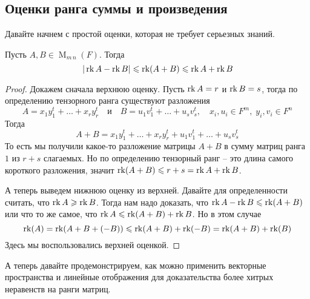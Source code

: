 \subsection{Оценки ранга суммы и произведения}

Давайте начнем с простой оценки, которая не требует серьезных знаний.

\begin{claim}
Пусть $A,B\in \operatorname{M}_{m\, n}(F)$.
Тогда
\[
|\operatorname{rk} A - \operatorname{rk} B| \leqslant \operatorname{rk}(A + B) \leqslant \operatorname{rk} A + \operatorname{rk} B
\]
\end{claim}
\begin{proof}
Докажем сначала верхнюю оценку.
Пусть $\operatorname{rk} A = r$ и $\operatorname{rk} B = s$, тогда по определению тензорного ранга существуют разложения
\[
A = x_1 y_1^t + \ldots + x_r y_r^t\quad \text{и}\quad
B = u_1 v_1^t + \ldots + u_s v_s^t,\quad x_i, u_i\in F^m,\;y_i,v_i\in F^n
\]
Тогда
\[
A + B = x_1 y_1^t + \ldots + x_r y_r^t + u_1 v_1^t + \ldots + u_s v_s^t
\]
То есть мы получили какое-то разложение матрицы $A+ B$ в сумму матриц ранга $1$ из $r+s$ слагаемых.
Но по определению тензорный ранг -- это длина самого короткого разложения, значит $\operatorname{rk}(A+B) \leqslant r + s = \operatorname{rk} A + \operatorname{rk} B$.

А теперь выведем нижнюю оценку из верхней.
Давайте для определенности считать, что  $\operatorname{rk} A \geqslant \operatorname{rk} B$.
Тогда нам надо доказать, что $\operatorname{rk} A - \operatorname{rk} B \leqslant \operatorname{rk}(A + B)$ или что то же самое, что $\operatorname{rk} A \leqslant \operatorname{rk} (A+B) + \operatorname{rk} B$.
Но в этом случае
\[
\operatorname{rk} (A) = \operatorname{rk}(A + B + (-B)) \leqslant \operatorname{rk}(A+B) +\operatorname{rk}(-B) = \operatorname{rk} (A+B) + \operatorname{rk}(B)
\]
Здесь мы воспользовались верхней оценкой.
\end{proof}


А теперь давайте продемонстрируем, как можно применить векторные пространства и линейные отображения для доказательства более хитрых неравенств на ранги матриц.

